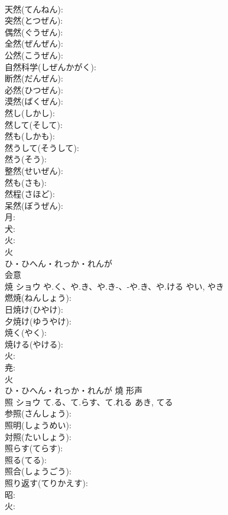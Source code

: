 \documentclass[8pt]{extreport}
\begin{document}
\begin{CJK}{UTF8}{min}
\\	天然(てんねん): 
\\	突然(とつぜん): 
\\	偶然(ぐうぜん): 
\\	全然(ぜんぜん): 
\\	公然(こうぜん): 
\\	自然科学(しぜんかがく): 
\\	断然(だんぜん): 
\\	必然(ひつぜん): 
\\	漠然(ばくぜん): 
\\	然し(しかし): 
\\	然して(そして): 
\\	然も(しかも): 
\\	然うして(そうして): 
\\	然う(そう): 
\\	整然(せいぜん): 
\\	然も(さも): 
\\	然程(さほど): 
\\	呆然(ぼうぜん): 
\\	月: 
\\	犬: 
\\	火: 
\\	火	
\\	ひ・ひへん・れっか・れんが	
\\	会意 
\\	焼	ショウ	や.く、や.き、や.き-、-や.き、や.ける	やい, やき	
\\	燃焼(ねんしょう): 
\\	日焼け(ひやけ): 
\\	夕焼け(ゆうやけ): 
\\	焼く(やく): 
\\	焼ける(やける): 
\\	火: 
\\	尭: 
\\	火	
\\	ひ・ひへん・れっか・れんが	燒	形声 
\\	照	ショウ	て.る、て.らす、て.れる	あき, てる	
\\	参照(さんしょう): 
\\	照明(しょうめい): 
\\	対照(たいしょう): 
\\	照らす(てらす): 
\\	照る(てる): 
\\	照合(しょうごう): 
\\	照り返す(てりかえす): 
\\	昭: 
\\	火: 

\end{CJK}
\end{document}
